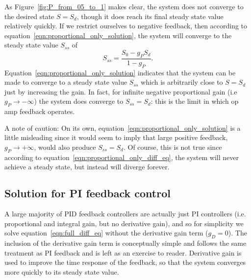 \documentclass{article}
\begin{document}
As Figure~\ref{fig:P_from_05_to_1} makes clear, the system does not converge to the desired state $S = S_d$, though it does reach its final steady state value relatively quickly. If we restrict ourselves to negative feedback, then according to equation~\ref{eqn:proportional_only_solution}, the system will converge to the steady state value $S_{ss}$ of 
\begin{equation}
S_{ss} = \frac{S_0 - g_P S_d}{1 - g_P}.
\end{equation}
Equation~\ref{eqn:proportional_only_solution} indicates that the system can be made to converge to a steady state value $S_{ss}$ which is arbitrarily close to $S = S_d$ just by increasing the gain. In fact, for infinite negative proportional gain (i.e $g_P \to -\infty$) the system does converge to $S_{ss} = S_d$: this is the limit in which op amp feedback operates.

A note of caution: On its own, equation~\ref{eqn:proportional_only_solution} is a little misleading since it would seem to imply that large positive feedback, $g_P \to +\infty$, would also produce $S_{ss} = S_d$. Of course, this is not true since according to equation~\ref{eqn:proportional_only_diff_eq}, the system will never achieve a steady state, but instead will diverge forever.

\subsection{Solution for PI feedback control}
\label{sec:time_evolution:solution}

A large majority of PID feedback controllers are actually just PI controllers (i.e. proportional and integral gain, but no derivative gain), and so for simplicity we solve equation~\ref{eqn:full_diff_eq} without the derivative gain term ($g_D = 0$). The inclusion of the derivative gain term is conceptually simple and follows the same treatment as PI feedback and is left as an exercise to reader. Derivative gain is used to improve the time response of the feedback, so that the system converges more quickly to its steady state value.
\end{document}
